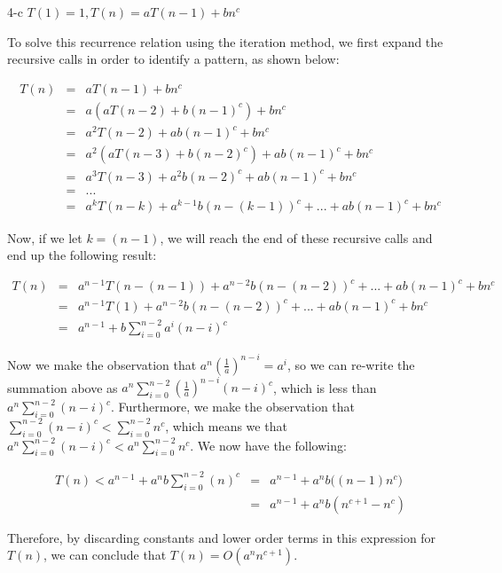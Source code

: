 \documentclass[11pt]{article}
\begin{document}
\begin{prob}{4-c}
$T(1) = 1, T(n) = aT(n-1) + bn^{c}$
\end{prob}
\begin{sol} 

To solve this recurrence relation using the iteration method, we first expand the recursive calls in order to identify a pattern, as shown below:

\begin{eqnarray*}
T(n) & = & aT(n-1) + bn^c \\
& = & a(aT(n-2) + b(n-1)^c) + bn^c \\
& = & a^2T(n-2) + ab(n-1)^c + bn^c\\
& = & a^2(aT(n-3) + b(n-2)^c) + ab(n-1)^c + bn^c \\
& = & a^3T(n-3) + a^2b(n-2)^c + ab(n-1)^c + bn^c \\
& = & ... \\
& = & a^kT(n-k) + a^{k-1}b(n-(k-1))^c + ... + ab(n-1)^c + bn^c
\end{eqnarray*}

Now, if we let $k = (n-1)$, we will reach the end of these recursive calls and end up the following result:

\begin{eqnarray*}
T(n) & = & a^{n-1}T(n-(n-1)) + a^{n-2}b(n-(n-2))^c + ... + ab(n-1)^c + bn^c \\
& = & a^{n-1}T(1) + a^{n-2}b(n-(n-2))^c + ... + ab(n-1)^c + bn^c \\
& = & a^{n-1} + b\sum_{i=0}^{n-2} a^i(n-i)^c
\end{eqnarray*}

Now we make the observation that $a^n(\frac{1}{a})^{n-i} = a^{i}$, so we can re-write the summation above as $a^{n}\sum_{i=0}^{n-2} (\frac{1}{a})^{n-i}(n-i)^c$, which is less than $a^{n}\sum_{i=0}^{n-2} (n-i)^c$. Furthermore, we make the observation that $\sum_{i=0}^{n-2} (n-i)^c < \sum_{i=0}^{n-2} n^c$, which means we that $a^{n}\sum_{i=0}^{n-2} (n-i)^c < a^{n}\sum_{i=0}^{n-2} n^c$. We now have the following:

\begin{eqnarray*}
T(n) < a^{n-1} + a^{n}b\sum_{i=0}^{n-2} (n)^c & = & a^{n-1} + a^{n}b\Big( (n-1)n^c \Big) \\
& = & a^{n-1} + a^{n}b(n^{c+1} - n^c)
\end{eqnarray*}

Therefore, by discarding constants and lower order terms in this expression for $T(n)$, we can conclude that $T(n) = O(a^nn^{c+1})$.

\end{sol}
\end{document}
